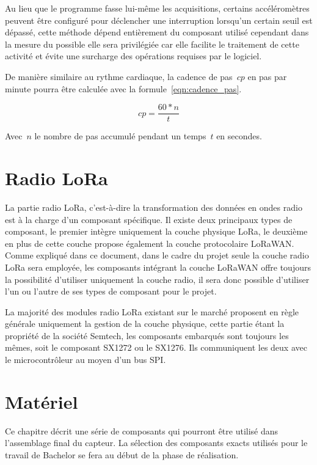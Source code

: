 Au lieu que le programme fasse lui-même les acquisitions, certains accéléromètres peuvent être configuré pour déclencher une interruption lorsqu’un certain seuil est dépassé, cette méthode dépend entièrement du composant utilisé cependant dans la mesure du possible elle sera privilégiée car elle facilite le traitement de cette activité et évite une surcharge des opérations requises par le logiciel.

De manière similaire au rythme cardiaque, la cadence de pas~$cp$ en pas par minute pourra être calculée avec la formule~\ref{eqn:cadence_pas}.

\begin{equation}\label{eqn:cadence_pas}
cp = \frac{60 * n}{t}
\end{equation}

Avec~$n$ le nombre de pas accumulé pendant un temps~$t$ en secondes.

\section{Radio LoRa}

La partie radio LoRa, c’est-à-dire la transformation des données en ondes radio est à la charge d’un composant spécifique. Il existe deux principaux types de composant, le premier intègre uniquement la couche physique LoRa, le deuxième en plus de cette couche propose également la couche protocolaire LoRaWAN. Comme expliqué dans ce document, dans le cadre du projet seule la couche radio LoRa sera employée, les composants intégrant la couche LoRaWAN offre toujours la possibilité d’utiliser uniquement la couche radio, il sera donc possible d’utiliser l’un ou l’autre de ses types de composant pour le projet.

La majorité des modules radio LoRa existant sur le marché proposent en règle générale uniquement la gestion de la couche physique, cette partie étant la propriété de la société Semtech, les composants embarqués sont toujours les mêmes, soit le composant SX1272 ou le SX1276. Ils communiquent les deux avec le microcontrôleur au moyen d’un bus SPI.

\section{Matériel}

Ce chapitre décrit une série de composants qui pourront être utilisé dans l’assemblage final du capteur. La sélection des composants exacts utilisés pour le travail de Bachelor se fera au début de la phase de réalisation.

